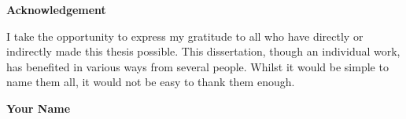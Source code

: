 \thispagestyle{empty}
\vspace{1cm}

\centerline{\Huge{\bf Acknowledgement}}
\vspace{.8cm}

\noindent
I take the opportunity to express my gratitude to all who have directly or indirectly made this thesis possible. This dissertation, though an individual work, has benefited in various ways from several people. Whilst it would be simple to name them all, it would not be easy to thank them enough. \\



\begin{flushright}
{\textbf{Your Name}}
\end{flushright}
